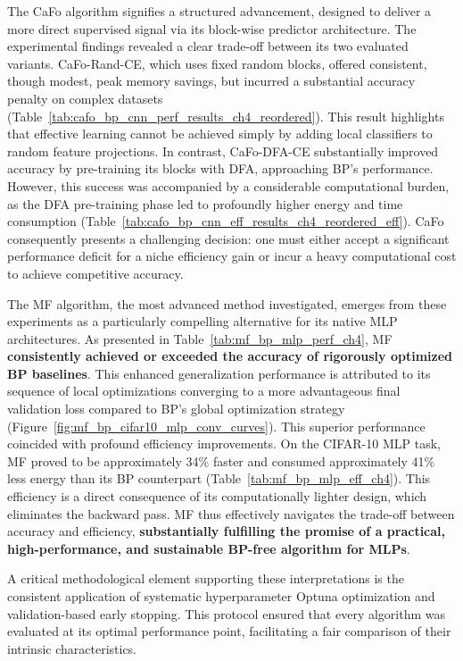 The CaFo algorithm signifies a structured advancement, designed to deliver a more direct supervised signal via its block-wise predictor architecture. The experimental findings revealed a clear trade-off between its two evaluated variants. CaFo-Rand-CE, which uses fixed random blocks, offered consistent, though modest, peak memory savings, but incurred a substantial accuracy penalty on complex datasets (Table~\ref{tab:cafo_bp_cnn_perf_results_ch4_reordered}). This result highlights that effective learning cannot be achieved simply by adding local classifiers to random feature projections. In contrast, CaFo-DFA-CE substantially improved accuracy by pre-training its blocks with DFA, approaching BP's performance. However, this success was accompanied by a considerable computational burden, as the DFA pre-training phase led to profoundly higher energy and time consumption (Table~\ref{tab:cafo_bp_cnn_eff_results_ch4_reordered_eff}). CaFo consequently presents a challenging decision: one must either accept a significant performance deficit for a niche efficiency gain or incur a heavy computational cost to achieve competitive accuracy.

The MF algorithm, the most advanced method investigated, emerges from these experiments as a particularly compelling alternative for its native MLP architectures. As presented in Table~\ref{tab:mf_bp_mlp_perf_ch4}, MF \textbf{consistently achieved or exceeded the accuracy of rigorously optimized BP baselines}. This enhanced generalization performance is attributed to its sequence of local optimizations converging to a more advantageous final validation loss compared to BP's global optimization strategy (Figure~\ref{fig:mf_bp_cifar10_mlp_conv_curves}). This superior performance coincided with profound efficiency improvements. On the CIFAR-10 MLP task, MF proved to be approximately 34\% faster and consumed approximately 41\% less energy than its BP counterpart (Table~\ref{tab:mf_bp_mlp_eff_ch4}). This efficiency is a direct consequence of its computationally lighter design, which eliminates the backward pass. MF thus effectively navigates the trade-off between accuracy and efficiency, \textbf{substantially fulfilling the promise of a practical, high-performance, and sustainable BP-free algorithm for MLPs}.

A critical methodological element supporting these interpretations is the consistent application of systematic hyperparameter Optuna optimization and validation-based early stopping. This protocol ensured that every algorithm was evaluated at its optimal performance point, facilitating a fair comparison of their intrinsic characteristics.

